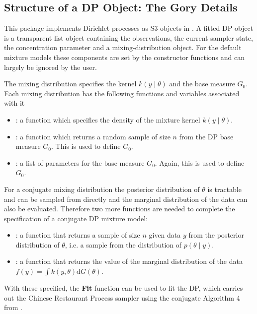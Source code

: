 \documentclass[nojss]{jss}
\begin{document}
\subsection{Structure of a DP Object: The Gory Details}
This package implements Dirichlet processes as S3 objects in . A fitted DP object is a transparent list object containing the observations, the current sampler state, the concentration parameter and a mixing-distribution object. For the default mixture models these components are set by the constructor functions and can largely be ignored by the user.

The mixing distribution specifies the kernel $k(y \mid \theta)$ and the base measure $G_0$. Each mixing distribution has the following functions and variables associated with it
\begin{itemize}
\item {}: a function which specifies the density of the mixture kernel $k(y \mid \theta)$.
\item {}: a function which returns a random sample of size $n$ from the DP base measure $G_0$. This is used to define $G_0$.
\item {}: a list of parameters for the base measure $G_0$. Again, this is used to define $G_0$.
\end{itemize}

For a conjugate mixing distribution the posterior distribution of $\theta$ is tractable and can be sampled from directly and the marginal distribution of the data can also be evaluated. Therefore two more functions are needed to complete the specification of a conjugate DP mixture model:
\begin{itemize}
\item {}: a function that returns a sample of size $n$ given data $y$ from the posterior distribution of $\theta$, i.e. a sample from the distribution of $p(\theta \mid y)$.
\item {}: a function that returns the value of the marginal distribution of the data $f(y) = \int k(y , \theta) \mathrm{d} G(\theta)$.
\end{itemize}

With these specified, the \textbf{Fit} function can be used to fit the DP, which carries out the Chinese Restaurant Process sampler using the conjugate Algorithm 4 from \citep{neal_markov_2000}.
\end{document}
